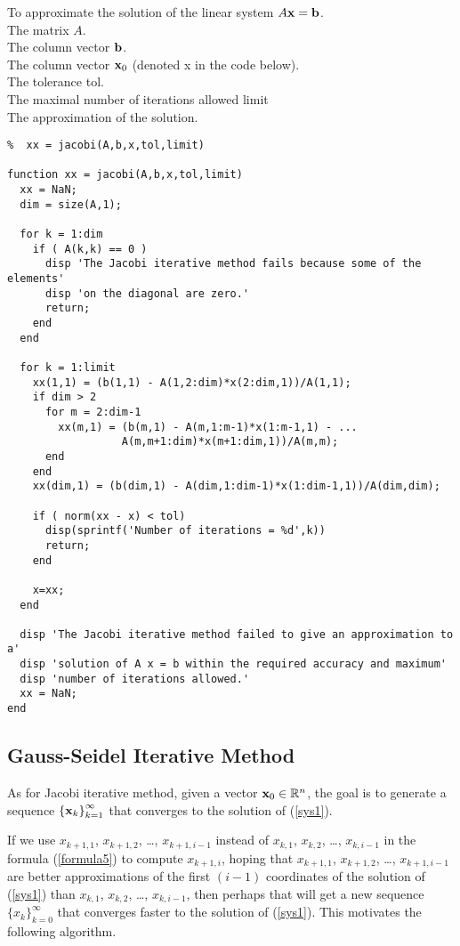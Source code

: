 \begin{code}
To approximate the solution of the linear system $A \mathbf{x} = \mathbf{b}$.\\
 The matrix $A$.\\
The column vector $\mathbf{b}$.\\
The column vector $\mathbf{x}_0$ (denoted x in the code below).\\
The tolerance  tol.\\
The maximal number of iterations allowed  limit\\
 The approximation of the solution.
\small
\begin{verbatim}
%  xx = jacobi(A,b,x,tol,limit)

function xx = jacobi(A,b,x,tol,limit)
  xx = NaN;
  dim = size(A,1);

  for k = 1:dim
    if ( A(k,k) == 0 )
      disp 'The Jacobi iterative method fails because some of the elements'
      disp 'on the diagonal are zero.'
      return;
    end
  end

  for k = 1:limit
    xx(1,1) = (b(1,1) - A(1,2:dim)*x(2:dim,1))/A(1,1);
    if dim > 2
      for m = 2:dim-1
        xx(m,1) = (b(m,1) - A(m,1:m-1)*x(1:m-1,1) - ...
                  A(m,m+1:dim)*x(m+1:dim,1))/A(m,m);
      end
    end
    xx(dim,1) = (b(dim,1) - A(dim,1:dim-1)*x(1:dim-1,1))/A(dim,dim);

    if ( norm(xx - x) < tol)
      disp(sprintf('Number of iterations = %d',k))
      return;
    end

    x=xx;
  end

  disp 'The Jacobi iterative method failed to give an approximation to a'
  disp 'solution of A x = b within the required accuracy and maximum'
  disp 'number of iterations allowed.'
  xx = NaN;
end
\end{verbatim}
\end{code}

\subsection{Gauss-Seidel Iterative Method}

As for Jacobi iterative method, given a vector
$\mathbf{x}_{0} \in \mathbb{R}^n$, the goal is to generate a sequence
$\left\{\mathbf{x}_{k}\right\}_{k=1}^\infty$ that converges to the
solution of (\ref{sys1}).

If we use $x_{k+1,1}$, $x_{k+1,2}$, \ldots , $x_{k+1,i-1}$
instead of $x_{k,1}$, $x_{k,2}$, \ldots , $x_{k,i-1}$ in the formula
(\ref{formula5}) to compute $x_{k+1,i}$, hoping that $x_{k+1,1}$, 
$x_{k+1,2}$, \ldots , $x_{k+1,i-1}$ are better
approximations of the first $(i-1)$ coordinates of the solution of
(\ref{sys1}) than $x_{k,1}$, $x_{k,2}$, \ldots ,
$x_{k,i-1}$, then perhaps that will get a new sequence
$\{x_k\}_{k=0}^\infty$ that converges faster to the solution of
(\ref{sys1}).  This motivates the following algorithm.

